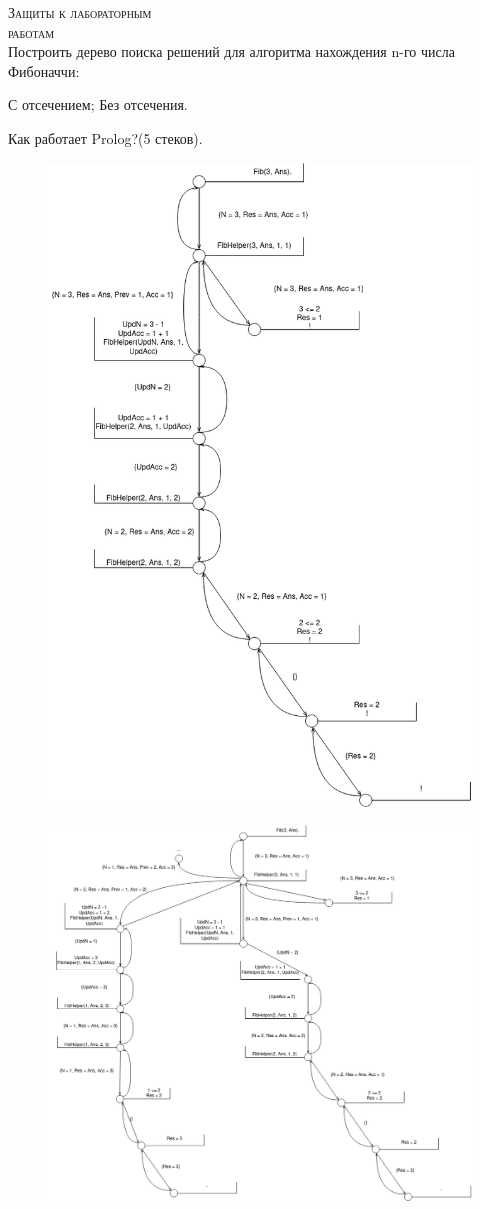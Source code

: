 \noindent\textsc{\huge Защиты к лабораторным\\работам} \\
Построить дерево поиска решений для алгоритма нахождения n-го числа Фибоначчи:
\begin{tasks}[label=\arabic*]
	\task С отсечением;
	\task Без отсечения.
\end{tasks}
Как работает Prolog?(5 стеков).
\begin{figure}[H]
	\centering
	\includegraphics[width=0.75\linewidth]{../additional/tree-cut.drawio.png}
\end{figure}
\begin{figure}[H]
	\centering
	\includegraphics[width=\linewidth]{../additional/tree-no-cut.drawio.png}
\end{figure}
